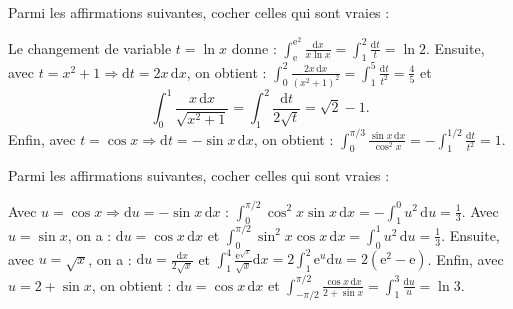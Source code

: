 \begin{question}
Parmi les affirmations suivantes, cocher celles qui sont vraies : 
\begin{answers}  
\end{answers}
\vskip2mm
\begin{explanations}
Le changement de variable $t=\ln x$ donne : $\displaystyle \int _{\mathrm{e}}^{\mathrm{e}^2}\frac{\mathrm{d}x}{x\ln x}=\int _1^2\frac{\mathrm{d}t}{t}=\ln 2$.
\vskip0mm
Ensuite, avec $t=x^2+1\Rightarrow \mathrm{d}t=2x\, \mathrm{d}x$, on obtient : $\displaystyle \int _0^{2}\frac{2x\,\mathrm{d}x}{(x^2+1)^2}=\int _{1}^5\frac{\mathrm{d}t}{t^2}=\frac{4}{5}$ et
$$\int _0^1\frac{x\,\mathrm{d}x}{\sqrt{x^2+1}}=\int _1^2\frac{\mathrm{d}t}{2\sqrt{t}}=\sqrt{2}-1.$$
Enfin, avec $t=\cos x\Rightarrow \mathrm{d}t=-\sin x\, \mathrm{d}x$, on obtient : $\displaystyle \int _{0}^{\pi/3}\frac{\sin x\, \mathrm{d}x}{\cos ^2x}=-\int _1^{1/2}\frac{\mathrm{d}t}{t^2}=1$.
\end{explanations}
\end{question}


\begin{question}
Parmi les affirmations suivantes, cocher celles qui sont vraies : 
\begin{answers}  
\end{answers}
\vskip2mm
\begin{explanations}
Avec $u=\cos x\Rightarrow \mathrm{d}u=-\sin x\,\mathrm{d}x$ : $\displaystyle \int _0^{\pi/2}\cos ^2x\sin x\,\mathrm{d}x=-\int _1^0u^2\, \mathrm{d}u=\frac{1}{3}$.
\vskip0mm
Avec $u=\sin x$, on a : $\mathrm{d}u=\cos x\,\mathrm{d}x$ et
$\displaystyle \int _0^{\pi/2}\sin ^2x\cos x\,\mathrm{d}x=\int _0^1u^2\, \mathrm{d}u=\frac{1}{3}$.
\vskip0mm
Ensuite, avec $u=\sqrt{x}$, on a : $\displaystyle \mathrm{d}u=\frac{\mathrm{d}x}{2\sqrt{x}}$ et
$\displaystyle \int _1^4\frac{\mathrm{e}^{\sqrt{x}}}{\sqrt{x}}\mathrm{d}x=2\int _1^2\mathrm{e}^{u}\mathrm{d}u=2(\mathrm{e}^2-\mathrm{e})$.
\vskip0mm
Enfin, avec $u=2+\sin x$, on obtient : $\mathrm{d}u=\cos x\, \mathrm{d}x$ et $\displaystyle \int _{-\pi/2}^{\pi/2}\frac{\cos x\,\mathrm{d}x}{2+\sin x}=\int _{1}^{3}\frac{\mathrm{d}u}{u}=\ln 3$.
\end{explanations}
\end{question}


